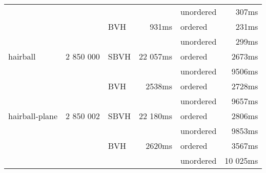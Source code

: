 \begin{tabular}{lrlrlr}
                   &           &      &          & unordered &   307ms \\
                   &           & BVH  &    931ms & ordered   &   231ms \\
                   &           &      &          & unordered &   299ms \\
    \midrule                                     
    hairball       & 2 850 000 & SBVH & 22 057ms & ordered   &  2673ms \\
                   &           &      &          & unordered &  9506ms \\
                   &           & BVH  &   2538ms & ordered   &  2728ms \\
                   &           &      &          & unordered &  9657ms \\
    \midrule                                     
    hairball-plane & 2 850 002 & SBVH & 22 180ms & ordered   &  2806ms \\
                   &           &      &          & unordered &  9853ms \\
                   &           & BVH  &   2620ms & ordered   &  3567ms \\
                   &           &      &          & unordered & 10 025ms \\
    \bottomrule
\end{tabular}

